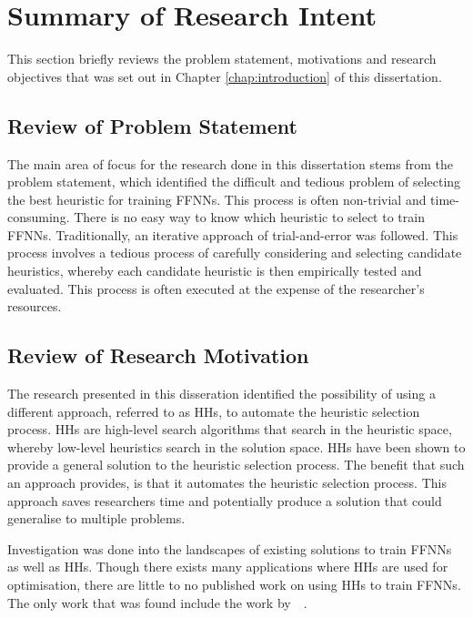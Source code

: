 \section{Summary of Research Intent}
\label{sec:conclusion:research_goals}

This section briefly reviews the problem statement, motivations and research objectives that was set out in Chapter \ref{chap:introduction} of this dissertation.

\subsection{Review of Problem Statement}
\label{sec:conclusion:research_goals:problem_statement}

The main area of focus for the research done in this dissertation stems from the problem statement, which identified the difficult and tedious problem of selecting the best heuristic for training \acp{FFNN}. This process is often non-trivial and time-consuming. There is no easy way to know which heuristic to select to train \acp{FFNN}. Traditionally, an iterative approach of trial-and-error was followed. This process involves a tedious process of carefully considering and selecting candidate heuristics, whereby each candidate heuristic is then empirically tested and evaluated. This process is often executed at the expense of the researcher's resources.


\subsection{Review of Research Motivation}
\label{sec:conclusion:research_goals:motivations}

The research presented in this disseration identified the possibility of using a different approach, referred to as \acp{HH}, to automate the heuristic selection process. \acp{HH} are high-level search algorithms that search in the heuristic space, whereby low-level heuristics search in the solution space. \acp{HH} have been shown to provide a general solution to the heuristic selection process. The benefit that such an approach provides, is that it automates the heuristic selection process. This approach saves researchers time and potentially produce a solution that could generalise to multiple problems.

Investigation was done into the landscapes of existing solutions to train \acp{FFNN} as well as \acp{HH}. Though there exists many applications where \acp{HH} are used for optimisation, there are little to no published work on using \acp{HH} to train \acp{FFNN}. The only work that was found include the work by~\citeauthor{ref:nel:2021}~\cite{ref:nel:2021}.

